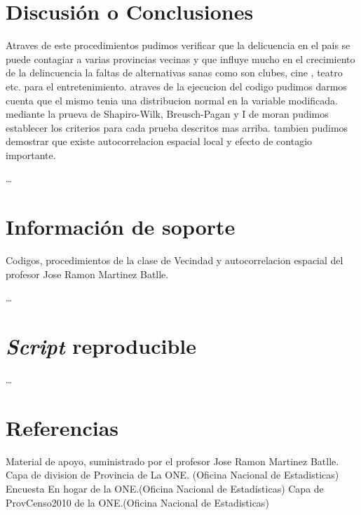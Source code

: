\documentclass[11pt,]{article}
\begin{document}
\section{Discusión o Conclusiones}\label{discusiuxf3n-o-conclusiones}

Atraves de este procedimientos pudimos verificar que la delicuencia en
el pais se puede contagiar a varias provincias vecinas y que influye
mucho en el crecimiento de la delincuencia la faltas de alternativas
sanas como son clubes, cine , teatro etc. para el entretenimiento.
atraves de la ejecucion del codigo pudimos darmos cuenta que el mismo
tenia una distribucion normal en la variable modificada. mediante la
prueva de Shapiro-Wilk, Breusch-Pagan y I de moran pudimos establecer
los criterios para cada prueba descritos mas arriba. tambien pudimos
demostrar que existe autocorrelacion espacial local y efecto de contagio
importante.

\ldots

\section{Información de soporte}\label{informaciuxf3n-de-soporte}

Codigos, procedimientos de la clase de Vecindad y autocorrelacion
espacial del profesor Jose Ramon Martinez Batlle.

\ldots

\section{\texorpdfstring{\emph{Script}
reproducible}{Script reproducible}}\label{script-reproducible}

\ldots

\section{Referencias}\label{referencias}

Material de apoyo, suministrado por el profesor Jose Ramon Martinez
Batlle. Capa de division de Provincia de La ONE. (Oficina Nacional de
Estadisticas) Encuesta En hogar de la ONE.(Oficina Nacional de
Estadisticas) Capa de ProvCenso2010 de la ONE.(Oficina Nacional de
Estadisticas)




\newpage
\singlespacing 
\end{document}
